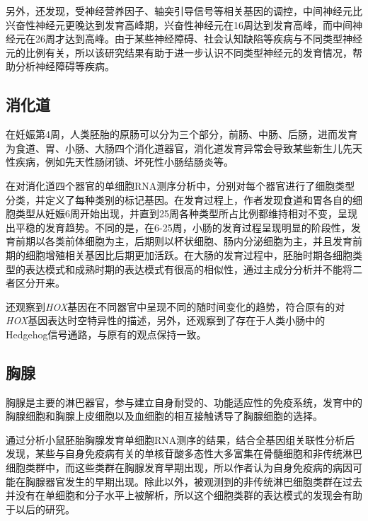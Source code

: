 \documentclass[lang=cn]{elegantpaper}
\begin{document}
另外，\cite{zhong_single-cell_2018}还发现，受神经营养因子、轴突引导信号等相关基因的调控，中间神经元比兴奋性神经元更晚达到发育高峰期，兴奋性神经元在16周达到发育高峰，而中间神经元在26周才达到高峰。由于某些神经障碍、社会认知缺陷等疾病与不同类型神经元的比例有关\citep{shi_rin_2005}，所以该研究结果有助于进一步认识不同类型神经元的发育情况，帮助分析神经障碍等疾病。

\subsection{消化道}
在妊娠第4周，人类胚胎的原肠可以分为三个部分，前肠、中肠、后肠，进而发育为食道、胃、小肠、大肠四个消化道器官\citep{kraus_patterning_2012}，消化道发育异常会导致某些新生儿先天性疾病，例如先天性肠闭锁、坏死性小肠结肠炎等\citep{palm_immunoglobulin_2014}。

在对消化道四个器官的单细胞RNA测序分析中，\cite{gao_tracing_2018}分别对每个器官进行了细胞类型分类，并定义了每种类别的标记基因。在发育过程上，作者发现食道和胃各自的细胞类型从妊娠6周开始出现，并直到25周各种类型所占比例都维持相对不变，呈现出平稳的发育趋势。不同的是，在6-25周，小肠的发育过程呈现明显的阶段性，发育前期以各类前体细胞为主，后期则以杯状细胞、肠内分泌细胞为主，并且发育前期的细胞增殖相关基因比后期更加活跃。在大肠的发育过程中，胚胎时期各细胞类型的表达模式和成熟时期的表达模式有很高的相似性，通过主成分分析并不能将二者区分开来。

\cite{gao_tracing_2018}还观察到\emph{HOX}基因在不同器官中呈现不同的随时间变化的趋势，符合原有的对\emph{HOX}基因表达时空特异性的描述\citep{beck_homeobox_2002}，另外，\cite{gao_glucose_1999}还观察到了存在于人类小肠中的Hedgehog信号通路，与原有的观点保持一致\citep{van_den_brink_indian_2004}。

\subsection{胸腺}
胸腺是主要的淋巴器官，参与建立自身耐受的、功能适应性的免疫系统\citep{gruver_cytokines_2008}，发育中的胸腺细胞和胸腺上皮细胞以及血细胞的相互接触诱导了胸腺细胞的选择\citep{hogquist_central_2005}。

通过分析小鼠胚胎胸腺发育单细胞RNA测序的结果，\cite{kernfeld_single-cell_2018}结合全基因组关联性分析后发现，某些与自身免疫病有关的单核苷酸多态性大多富集在骨髓细胞和非传统淋巴细胞类群中，而这些类群在胸腺发育早期出现，所以作者认为自身免疫病的病因可能在胸腺器官发生的早期出现。除此以外，被观测到的非传统淋巴细胞类群在过去并没有在单细胞和分子水平上被解析\citep{brennecke_single-cell_2015}，所以这个细胞类群的表达模式的发现会有助于以后的研究。
\end{document}
